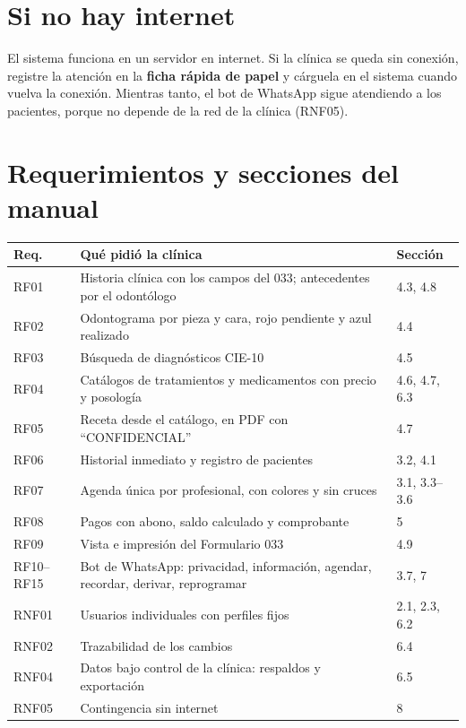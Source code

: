 \documentclass[11pt,a4paper,oneside]{report}
\begin{document}
\chapter{Si no hay internet}
El sistema funciona en un servidor en internet. Si la clínica se queda sin conexión, registre la atención en la
\textbf{ficha rápida de papel} y cárguela en el sistema cuando vuelva la conexión. Mientras tanto, el bot de
WhatsApp sigue atendiendo a los pacientes, porque no depende de la red de la clínica (RNF05).

\appendix
\chapter{Requerimientos y secciones del manual}
\begin{center}
\small
\begin{tabularx}{\linewidth}{@{}lXl@{}}
\toprule
\textbf{Req.} & \textbf{Qué pidió la clínica} & \textbf{Sección} \\ \midrule
RF01 & Historia clínica con los campos del 033; antecedentes por el odontólogo & 4.3, 4.8 \\
RF02 & Odontograma por pieza y cara, rojo pendiente y azul realizado & 4.4 \\
RF03 & Búsqueda de diagnósticos CIE-10 & 4.5 \\
RF04 & Catálogos de tratamientos y medicamentos con precio y posología & 4.6, 4.7, 6.3 \\
RF05 & Receta desde el catálogo, en PDF con ``CONFIDENCIAL'' & 4.7 \\
RF06 & Historial inmediato y registro de pacientes & 3.2, 4.1 \\
RF07 & Agenda única por profesional, con colores y sin cruces & 3.1, 3.3--3.6 \\
RF08 & Pagos con abono, saldo calculado y comprobante & 5 \\
RF09 & Vista e impresión del Formulario 033 & 4.9 \\
RF10--RF15 & Bot de WhatsApp: privacidad, información, agendar, recordar, derivar, reprogramar & 3.7, 7 \\
RNF01 & Usuarios individuales con perfiles fijos & 2.1, 2.3, 6.2 \\
RNF02 & Trazabilidad de los cambios & 6.4 \\
RNF04 & Datos bajo control de la clínica: respaldos y exportación & 6.5 \\
RNF05 & Contingencia sin internet & 8 \\ \bottomrule
\end{tabularx}
\end{center}
\end{document}
